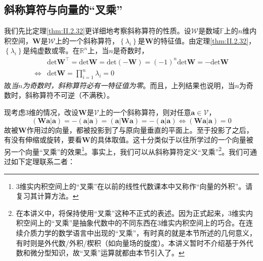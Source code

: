 \documentclass[main.tex]{subfiles}
\begin{document}
\subsection{斜称算符与向量的“叉乘”}
我们先比定理\ref{thm:II.2.32}更详细地考察斜称算符的性质。设$\mathcal{W}$是数域$\mathbb{F}$上的$n$维内积空间，$\mathbf{W}$是$\mathcal{W}$上的一个斜称算符，$\left\{\lambda_i\right\}$是$\mathbf{W}$的特征值。由定理\ref{thm:II.2.32}，$\left\{\lambda_i\right\}$是纯虚数或零。在$\mathbb{R}^n$上，当$n$是奇数时，
\begin{align*}
                    & \mathrm{det}\mathbf{W}^\intercal=\mathrm{det}\mathbf{W}=\mathrm{det}\left(-\mathbf{W}\right)=\left(-1\right)^n\mathrm{det}\mathbf{W}=-\mathrm{det}\mathbf{W} \\
    \Leftrightarrow & \mathrm{det}\mathbf{W}=\prod_{i=1}^n\lambda_i=0
\end{align*}
故\emph{当$n$为奇数时，斜称算符必有一特征值为零}。而且，上列结果也说明，当$n$为奇数时，斜称算符不可逆（不满秩）。

现考虑3维的情况，改设$\mathbf{W}$是$\mathcal{V}$上的一个斜称算符，则对任意$\mathbf{a}\in\mathcal{V}$，
\[\left(\mathbf{Wa}|\mathbf{a}\right)=-\left(\mathbf{a}|\mathbf{a}\right)=\left(\mathbf{a}|\mathbf{Wa}\right)=-\left(\mathbf{a}|\mathbf{a}\right)\Leftrightarrow\left(\mathbf{Wa}|\mathbf{a}\right)=0\]
故被$\mathbf{W}$作用过的向量，都被投影到了与原向量垂直的平面上。至于投影了之后，有没有伸缩或旋转，要看$\mathbf{W}$的具体取值。这十分类似于以往所学过的一个向量被另一个向量“叉乘”的效果\footnote{3维实内积空间上的“叉乘”在以前的线性代数课本中又称作“向量的外积”\cite[\S3.2]{周胜林2012线性代数}。请复习其计算方法。}。事实上，我们可以从斜称算符定义“叉乘”\footnote{在本讲义中，将保持使用“叉乘”这种不正式的表述。因为正式起来，3维实内积空间上的“叉乘”是抽象代数中的不同东西在3维实内积空间上的巧合。在连续介质力学的数学语言中出现的“叉乘”，有时真的就是本节所述的几何意义，有时则是外代数/外积/楔积（如向量场的旋度）。本讲义暂时不介绍基于外代数和微分型知识，故“叉乘”运算就都由本节引入了。}。我们可通过如下定理联系二者：
\end{document}
